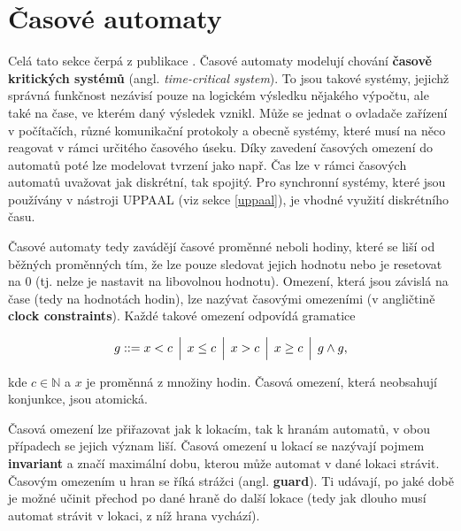 \section{Časové automaty}
Celá tato sekce čerpá z publikace \cite{mc_principles}. Časové automaty modelují chování \textbf{časově kritických systémů} (angl. \textit{time-critical system}). To jsou takové systémy, jejichž správná funkčnost nezávisí pouze na logickém výsledku nějakého výpočtu, ale také na čase, ve kterém daný výsledek vznikl. Může se jednat o ovladače zařízení v počítačích, různé komunikační protokoly a obecně systémy, které musí na něco reagovat v rámci určitého časového úseku. Díky zavedení časových omezení do automatů poté lze modelovat tvrzení jako např.  Čas lze v rámci časových automatů uvažovat jak diskrétní, tak spojitý. Pro synchronní systémy, které jsou používány v nástroji UPPAAL (viz sekce \ref{uppaal}), je vhodné využití diskrétního času.

Časové automaty tedy zavádějí časové proměnné neboli hodiny, které se liší od běžných proměnných tím, že lze pouze sledovat jejich hodnotu nebo je resetovat na 0 (tj. nelze je nastavit na libovolnou hodnotu). Omezení, která jsou závislá na čase (tedy na hodnotách hodin), lze nazývat časovými omezeními (v angličtině \textbf{clock constraints}). Každé takové omezení odpovídá gramatice

\begin{equation*}
    g ::= x < c \hspace{0.15cm} \Big| \hspace{0.15cm} x \leq c \hspace{0.15cm} \Big| \hspace{0.15cm} x > c \hspace{0.15cm} \Big| \hspace{0.15cm} x \geq c \hspace{0.15cm} \Big| \hspace{0.15cm} g \wedge g,
\end{equation*}

kde $c \in \mathbb{N}$ a $x$ je proměnná z množiny hodin. Časová omezení, která neobsahují konjunkce, jsou atomická.

Časová omezení lze přiřazovat jak k lokacím, tak k hranám automatů, v obou případech se jejich význam liší. Časová omezení u lokací se nazývají pojmem \textbf{invariant} a značí maximální dobu, kterou může automat v dané lokaci strávit. Časovým omezením u hran se říká strážci (angl. \textbf{guard}). Ti udávají, po jaké době je možné učinit přechod po dané hraně do další lokace (tedy jak dlouho musí automat strávit v lokaci, z níž hrana vychází).

